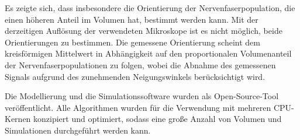 Es zeigte sich, dass insbesondere die Orientierung der Nervenfaserpopulation, die einen höheren Anteil im Volumen hat, bestimmt werden kann.
Mit der derzeitigen Auflösung der verwendeten Mikroskope ist es nicht möglich, beide Orientierungen zu bestimmen.
Die gemessene Orientierung scheint dem kreisförmigen Mittelwert in Abhängigkeit auf den proportionalen Volumenanteil der Nervenfaserpopulationen zu folgen, wobei die Abnahme des gemessenen Signals aufgrund des zunehmenden Neigungswinkels berücksichtigt wird.

Die Modellierung und die Simulationssoftware wurden als Open-Source-Tool veröffentlicht.
Alle Algorithmen wurden für die Verwendung mit mehreren CPU-Kernen konzipiert und optimiert, sodass eine große Anzahl von Volumen und Simulationen durchgeführt werden kann.